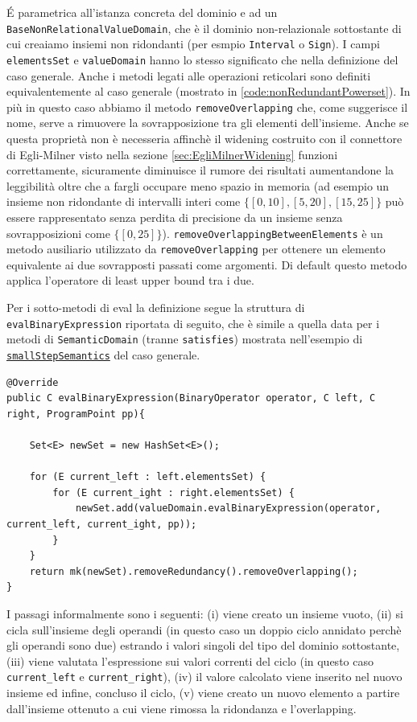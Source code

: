 \'E parametrica all'istanza concreta del dominio e ad un \texttt{BaseNonRelationalValueDomain}, che è il dominio non-relazionale sottostante di cui creaiamo insiemi non ridondanti (per esmpio \texttt{Interval} o \texttt{Sign}). I campi \texttt{elementsSet} e \texttt{valueDomain} hanno lo stesso significato che nella definizione del caso generale. Anche i metodi legati alle operazioni reticolari sono definiti equivalentemente al caso generale (mostrato in \ref{code:nonRedundantPowerset}). In più in questo caso abbiamo il metodo \texttt{removeOverlapping} che, come suggerisce il nome, serve a rimuovere la sovrapposizione tra gli elementi dell'insieme. Anche se questa proprietà non è necesseria affinchè il widening costruito con il connettore di Egli-Milner visto nella sezione \ref{sec:EgliMilnerWidening} funzioni correttamente, sicuramente diminuisce il rumore dei risultati aumentandone la leggibilità oltre che a fargli occupare meno spazio in memoria (ad esempio un insieme non ridondante di intervalli interi come \(\{[0, 10], [5, 20], [15, 25]\}\) può essere rappresentato senza perdita di precisione da un insieme senza sovrapposizioni come \(\{[0, 25]\}\)). \texttt{removeOverlappingBetweenElements} è un metodo ausiliario utilizzato da \texttt{removeOverlapping} per ottenere un elemento equivalente ai due sovrapposti passati come argomenti. Di default questo metodo applica l'operatore di least upper bound tra i due.

Per i sotto-metodi di eval la definizione segue la struttura di \texttt{evalBinaryExpression} riportata di seguito, che è simile a quella data per i metodi di \texttt{SemanticDomain} (tranne \texttt{satisfies}) mostrata nell'esempio di \hyperref[code:smallStepSemanticsPowersetGeneral]{\texttt{smallStepSemantics}} del caso generale.
\begin{lstlisting}[belowskip=-1.1 \baselineskip]
@Override
public C evalBinaryExpression(BinaryOperator operator, C left, C right, ProgramPoint pp){

    Set<E> newSet = new HashSet<E>();
    
    for (E current_left : left.elementsSet) {
        for (E current_ight : right.elementsSet) {
            newSet.add(valueDomain.evalBinaryExpression(operator, current_left, current_ight, pp));
        }
    }
    return mk(newSet).removeRedundancy().removeOverlapping();
}
\end{lstlisting}
I passagi informalmente sono i seguenti: (i) viene creato un insieme vuoto, (ii) si cicla sull'insieme degli operandi (in questo caso un doppio ciclo annidato perchè gli operandi sono due) estrando i valori singoli del tipo del dominio sottostante, (iii) viene valutata l'espressione sui valori correnti del ciclo (in questo caso \texttt{current\_left} e \texttt{current\_right}), (iv) il valore calcolato viene inserito nel nuovo insieme ed infine, concluso il ciclo, (v) viene creato un nuovo elemento a partire dall'insieme ottenuto a cui viene rimossa la ridondanza e l'overlapping.

